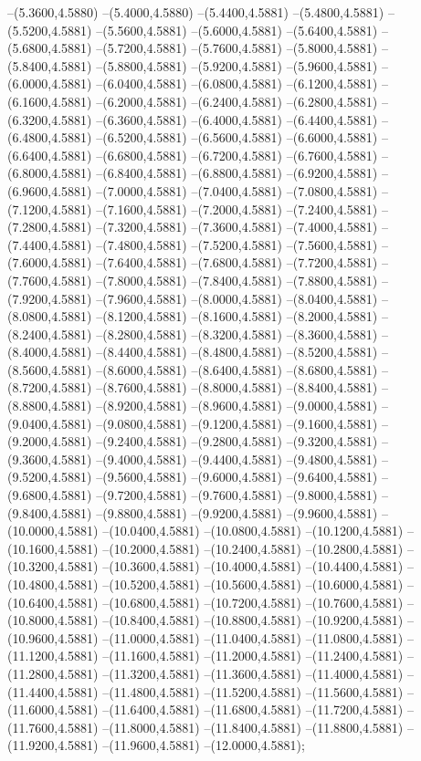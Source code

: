 {	--(5.3600,4.5880)
	--(5.4000,4.5880)
	--(5.4400,4.5881)
	--(5.4800,4.5881)
	--(5.5200,4.5881)
	--(5.5600,4.5881)
	--(5.6000,4.5881)
	--(5.6400,4.5881)
	--(5.6800,4.5881)
	--(5.7200,4.5881)
	--(5.7600,4.5881)
	--(5.8000,4.5881)
	--(5.8400,4.5881)
	--(5.8800,4.5881)
	--(5.9200,4.5881)
	--(5.9600,4.5881)
	--(6.0000,4.5881)
	--(6.0400,4.5881)
	--(6.0800,4.5881)
	--(6.1200,4.5881)
	--(6.1600,4.5881)
	--(6.2000,4.5881)
	--(6.2400,4.5881)
	--(6.2800,4.5881)
	--(6.3200,4.5881)
	--(6.3600,4.5881)
	--(6.4000,4.5881)
	--(6.4400,4.5881)
	--(6.4800,4.5881)
	--(6.5200,4.5881)
	--(6.5600,4.5881)
	--(6.6000,4.5881)
	--(6.6400,4.5881)
	--(6.6800,4.5881)
	--(6.7200,4.5881)
	--(6.7600,4.5881)
	--(6.8000,4.5881)
	--(6.8400,4.5881)
	--(6.8800,4.5881)
	--(6.9200,4.5881)
	--(6.9600,4.5881)
	--(7.0000,4.5881)
	--(7.0400,4.5881)
	--(7.0800,4.5881)
	--(7.1200,4.5881)
	--(7.1600,4.5881)
	--(7.2000,4.5881)
	--(7.2400,4.5881)
	--(7.2800,4.5881)
	--(7.3200,4.5881)
	--(7.3600,4.5881)
	--(7.4000,4.5881)
	--(7.4400,4.5881)
	--(7.4800,4.5881)
	--(7.5200,4.5881)
	--(7.5600,4.5881)
	--(7.6000,4.5881)
	--(7.6400,4.5881)
	--(7.6800,4.5881)
	--(7.7200,4.5881)
	--(7.7600,4.5881)
	--(7.8000,4.5881)
	--(7.8400,4.5881)
	--(7.8800,4.5881)
	--(7.9200,4.5881)
	--(7.9600,4.5881)
	--(8.0000,4.5881)
	--(8.0400,4.5881)
	--(8.0800,4.5881)
	--(8.1200,4.5881)
	--(8.1600,4.5881)
	--(8.2000,4.5881)
	--(8.2400,4.5881)
	--(8.2800,4.5881)
	--(8.3200,4.5881)
	--(8.3600,4.5881)
	--(8.4000,4.5881)
	--(8.4400,4.5881)
	--(8.4800,4.5881)
	--(8.5200,4.5881)
	--(8.5600,4.5881)
	--(8.6000,4.5881)
	--(8.6400,4.5881)
	--(8.6800,4.5881)
	--(8.7200,4.5881)
	--(8.7600,4.5881)
	--(8.8000,4.5881)
	--(8.8400,4.5881)
	--(8.8800,4.5881)
	--(8.9200,4.5881)
	--(8.9600,4.5881)
	--(9.0000,4.5881)
	--(9.0400,4.5881)
	--(9.0800,4.5881)
	--(9.1200,4.5881)
	--(9.1600,4.5881)
	--(9.2000,4.5881)
	--(9.2400,4.5881)
	--(9.2800,4.5881)
	--(9.3200,4.5881)
	--(9.3600,4.5881)
	--(9.4000,4.5881)
	--(9.4400,4.5881)
	--(9.4800,4.5881)
	--(9.5200,4.5881)
	--(9.5600,4.5881)
	--(9.6000,4.5881)
	--(9.6400,4.5881)
	--(9.6800,4.5881)
	--(9.7200,4.5881)
	--(9.7600,4.5881)
	--(9.8000,4.5881)
	--(9.8400,4.5881)
	--(9.8800,4.5881)
	--(9.9200,4.5881)
	--(9.9600,4.5881)
	--(10.0000,4.5881)
	--(10.0400,4.5881)
	--(10.0800,4.5881)
	--(10.1200,4.5881)
	--(10.1600,4.5881)
	--(10.2000,4.5881)
	--(10.2400,4.5881)
	--(10.2800,4.5881)
	--(10.3200,4.5881)
	--(10.3600,4.5881)
	--(10.4000,4.5881)
	--(10.4400,4.5881)
	--(10.4800,4.5881)
	--(10.5200,4.5881)
	--(10.5600,4.5881)
	--(10.6000,4.5881)
	--(10.6400,4.5881)
	--(10.6800,4.5881)
	--(10.7200,4.5881)
	--(10.7600,4.5881)
	--(10.8000,4.5881)
	--(10.8400,4.5881)
	--(10.8800,4.5881)
	--(10.9200,4.5881)
	--(10.9600,4.5881)
	--(11.0000,4.5881)
	--(11.0400,4.5881)
	--(11.0800,4.5881)
	--(11.1200,4.5881)
	--(11.1600,4.5881)
	--(11.2000,4.5881)
	--(11.2400,4.5881)
	--(11.2800,4.5881)
	--(11.3200,4.5881)
	--(11.3600,4.5881)
	--(11.4000,4.5881)
	--(11.4400,4.5881)
	--(11.4800,4.5881)
	--(11.5200,4.5881)
	--(11.5600,4.5881)
	--(11.6000,4.5881)
	--(11.6400,4.5881)
	--(11.6800,4.5881)
	--(11.7200,4.5881)
	--(11.7600,4.5881)
	--(11.8000,4.5881)
	--(11.8400,4.5881)
	--(11.8800,4.5881)
	--(11.9200,4.5881)
	--(11.9600,4.5881)
	--(12.0000,4.5881);
}
